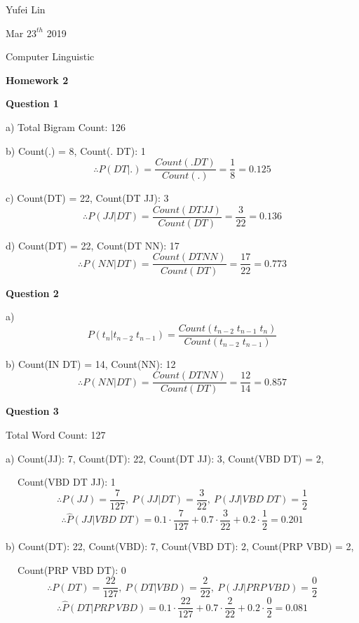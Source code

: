 \documentclass[a4paper,12pt]{report}
\begin{document}
\noindent
Yufei Lin


\noindent
Mar \(23^{th}\) 2019

\noindent
Computer Linguistic
\begin{center}
\textbf{Homework 2} 
\end{center}

\noindent
\textbf{Question 1}

a) Total Bigram Count: 126

b) Count(.) = 8, Count(. DT): 1
\[\therefore P(DT|.) = \frac{Count(. DT)}{Count(.)} = \frac{1}{8} = 0.125\]

c) Count(DT) = 22, Count(DT JJ): 3
\[\therefore P(JJ|DT) = \frac{Count(DT JJ)}{Count(DT)} = \frac{3}{22} = 0.136\]

d) Count(DT) = 22, Count(DT NN): 17
\[\therefore P(NN|DT) = \frac{Count(DT NN)}{Count(DT)} = \frac{17}{22} = 0.773\]

\noindent
\textbf{Question 2}

a) \[P(t_n|t_{n-2} \; t_{n-1}) = \frac{Count(t_{n-2} \; t_{n-1} \; t_n)}{Count(t_{n-2} \; t_{n-1})}\]

b) Count(IN DT) = 14, Count(NN): 12
\[\therefore P(NN|DT) = \frac{Count(DT NN)}{Count(DT)} = \frac{12}{14} = 0.857\]

\noindent
\textbf{Question 3}

Total Word Count: 127

a) Count(JJ): 7, Count(DT): 22, Count(DT JJ): 3, Count(VBD DT) = 2, 

$\: \: \: \:$   Count(VBD DT JJ): 1
\[\therefore P(JJ) = \frac{7}{127},\: P(JJ|DT) = \frac{3}{22},\: P(JJ|VBD \: DT) = \frac{1}{2}\]
\[\therefore \hat{P}(JJ|VBD \; DT) = 0.1\cdot\frac{7}{127} + 0.7 \cdot \frac{3}{22} + 0.2 \cdot \frac{1}{2} = 0.201\]

b) Count(DT): 22, Count(VBD): 7, Count(VBD DT): 2, Count(PRP VBD) = 2, 

$\: \: \: \:$   Count(PRP VBD DT): 0
\[\therefore P(DT) = \frac{22}{127},\: P(DT|VBD) = \frac{2}{22},\: P(JJ|PRP \: VBD) = \frac{0}{2}\]
\[\therefore \hat{P}(DT|PRP \; VBD) = 0.1\cdot\frac{22}{127} + 0.7 \cdot \frac{2}{22} + 0.2 \cdot \frac{0}{2} = 0.081\]
\end{document}
